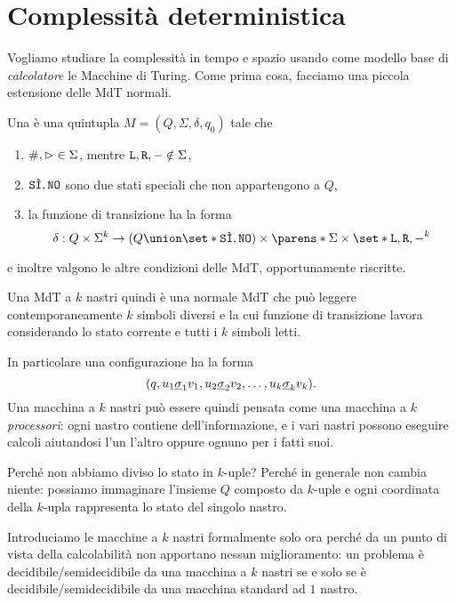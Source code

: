 \section{Complessità deterministica}

Vogliamo studiare la complessità in tempo e spazio usando come modello
base di \emph{calcolatore} le Macchine di Turing.
Come prima cosa, facciamo una piccola estensione delle MdT normali.

\begin{definition}
    Una  è una quintupla 
    $M = (Q, \Sigma, \delta, q_0)$ tale che \begin{enumerate}[(1)]
        \item $\#, \resp \in \Sigma$, mentre $\Left, \Right, \blank \notin \Sigma$,
        \item $\SI, \NO$ sono due stati speciali che non appartengono a $Q$,
        \item la funzione di transizione ha la forma \[
            \delta : Q \times \Sigma^k \to 
                (Q \union \set*{\SI, \NO}) \times 
                    \parens*{\Sigma \times \set*{\Left, \Right, \blank}}^k
        \]   
    \end{enumerate} e inoltre valgono le altre condizioni delle MdT, 
    opportunamente riscritte.
\end{definition}

Una MdT a $k$ nastri quindi è una normale MdT che può leggere
contemporaneamente $k$ simboli diversi e la cui funzione di transizione
lavora considerando lo stato corrente e tutti i $k$ simboli letti.

In particolare una configurazione ha la forma \[
    (q, u_1\ul{\sigma}_1v_1, u_2\ul{\sigma}_2v_2, \dots, u_k\ul{\sigma}_kv_k).
\] Una macchina a $k$ nastri può essere quindi pensata come 
una macchina a \emph{$k$ processori}: ogni nastro contiene dell'informazione,
e i vari nastri possono eseguire calcoli aiutandosi l'un l'altro oppure
ognuno per i fatti suoi.

Perché non abbiamo diviso lo stato in $k$-uple? 
Perché in generale non cambia niente: possiamo immaginare l'insieme $Q$ 
composto da $k$-uple e ogni coordinata della $k$-upla rappresenta lo stato
del singolo nastro.

Introduciamo le macchine a $k$ nastri formalmente solo ora perché da un
punto di vista della calcolabilità non apportano nessun miglioramento:
un problema è decidibile/semidecidibile da una macchina a $k$ nastri se e
solo se è decidibile/semidecidibile da una macchina standard ad $1$ nastro.

